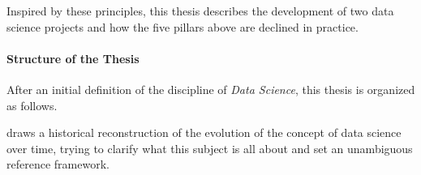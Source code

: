 Inspired by these principles, this thesis describes the development of two data science projects and how the five pillars above are declined in practice.


\paragraph{Structure of the Thesis}

After an initial definition of the discipline of \emph{Data Science}, this thesis is organized as follows.

 draws a historical reconstruction of the evolution of the concept of data science over time, trying to clarify what this subject is all about and set an unambiguous reference framework. 


